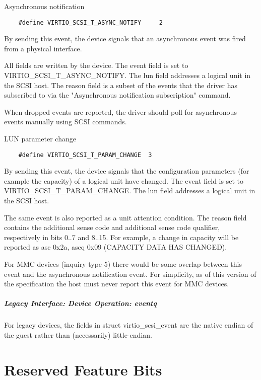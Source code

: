   Asynchronous notification
\begin{lstlisting}
	#define VIRTIO_SCSI_T_ASYNC_NOTIFY     2
\end{lstlisting}

  By sending this event, the device signals that an asynchronous
  event was fired from a physical interface.

  All fields are written by the device. The event field is set to
  VIRTIO_SCSI_T_ASYNC_NOTIFY. The lun field addresses a logical
  unit in the SCSI host. The reason field is a subset of the
  events that the driver has subscribed to via the "Asynchronous
  notification subscription" command.

  When dropped events are reported, the driver should poll for
  asynchronous events manually using SCSI commands.

  LUN parameter change
\begin{lstlisting}
	#define VIRTIO_SCSI_T_PARAM_CHANGE  3
\end{lstlisting}

  By sending this event, the device signals that the configuration parameters
  (for example the capacity) of a logical unit have changed.
  The event field is set to VIRTIO_SCSI_T_PARAM_CHANGE.
  The lun field addresses a logical unit in the SCSI host.

  The same event is also reported as a unit attention condition.
  The reason field contains the additional sense code and additional sense code qualifier,
  respectively in bits 0..7 and 8..15.
  For example, a change in capacity will be reported as asc 0x2a, ascq 0x09
  (CAPACITY DATA HAS CHANGED).

  For MMC devices (inquiry type 5) there would be some overlap between this
  event and the asynchronous notification event.
  For simplicity, as of this version of the specification the host must
  never report this event for MMC devices.

\paragraph{Legacy Interface: Device Operation: eventq}\label{sec:Device Types / SCSI Host Device / Device Operation / Device Operation: eventq / Legacy Interface: Device Operation: eventq}
For legacy devices, the fields in struct virtio_scsi_event are the
native endian of the guest rather than (necessarily) little-endian.

\chapter{Reserved Feature Bits}\label{sec:Reserved Feature Bits}

